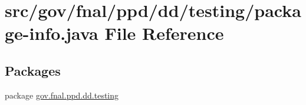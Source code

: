 \hypertarget{dd_2testing_2package-info_8java}{\section{src/gov/fnal/ppd/dd/testing/package-\/info.java File Reference}
\label{dd_2testing_2package-info_8java}
}
\subsection*{Packages}
\begin{DoxyCompactItemize}
\item 
package \hyperlink{namespacegov_1_1fnal_1_1ppd_1_1dd_1_1testing}{gov.\-fnal.\-ppd.\-dd.\-testing}
\end{DoxyCompactItemize}
